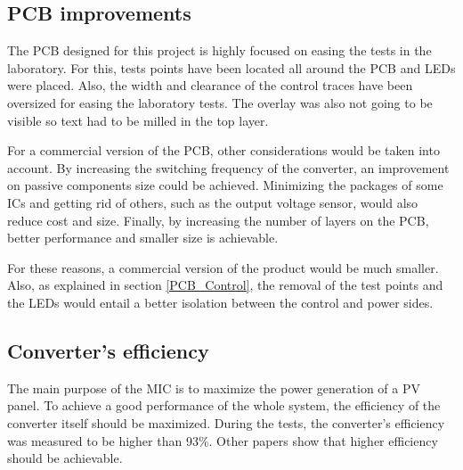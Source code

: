 \subsection{PCB improvements}
The PCB designed for this project is highly focused on easing the tests in the laboratory. For this, tests points have been located all around the PCB and LEDs were placed. Also, the width and clearance of the control traces have been oversized for easing the laboratory tests. The overlay was also not going to be visible so text had to be milled in the top layer. 

For a commercial version of the PCB, other considerations would be taken into account. By increasing the switching frequency of the converter, an improvement on passive components size could be achieved. Minimizing the packages of some ICs and getting rid of others, such as the output voltage sensor, would also reduce cost and size. Finally, by increasing the number of layers on the PCB, better performance and smaller size is achievable.

For these reasons, a commercial version of the product would be much smaller. Also, as explained in section \ref{PCB_Control}, the removal of the test points and the LEDs would entail a better isolation between the control and power sides.



\subsection{Converter's efficiency}
The main purpose of the MIC is to maximize the power generation of a PV panel. To achieve a good performance of the whole system, the efficiency of the converter itself should be maximized. During the tests, the converter's efficiency was measured to be higher than 93\%. Other papers show that higher efficiency should be achievable. \cite{underthehood}  \cite{efficient_buckboost}


